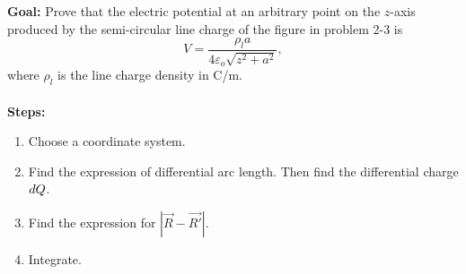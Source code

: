 \documentclass[../../header.tex]{subfiles}
\begin{document}
\textbf{Goal:} Prove that the electric potential at an arbitrary point on the $z$-axis produced by the semi-circular line charge of the figure in problem 2-3 is
\begin{equation*}
V = \frac{\rho_l a}{4\varepsilon_o \sqrt{z^2 + a^2}},
\end{equation*}
where $\rho_l$ is the line charge density in C/m.\\
\\
\textbf{Steps:}
	\begin{enumerate}
	\item Choose a coordinate system.
	
	
	\item Find the expression of differential arc length. Then find the differential charge $d{}Q$.
	

  \item Find the expression for $|\vec{R} - \vec{R'}|$.
	
	\item Integrate.
	
	\end{enumerate}
\answer{}
\end{document}
